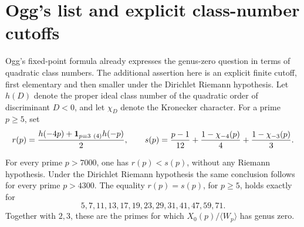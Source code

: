\section{Ogg's list and explicit class-number cutoffs}
Ogg's fixed-point formula already expresses the genus-zero question
in terms of quadratic class numbers. The additional assertion here is
an explicit finite cutoff, first elementary and then smaller under
the Dirichlet Riemann hypothesis.
Let \(h(D)\) denote the proper ideal class number of the quadratic
order of discriminant \(D<0\), and let \(\chi_D\) denote the
Kronecker character. For a prime \(p\ge5\), set
\[
 r(p)=\frac{h(-4p)+{\bf1}_{p\equiv3\ (4)}h(-p)}2,\qquad
 s(p)=\frac{p-1}{12}+\frac{1-\chi_{-4}(p)}4+
                         \frac{1-\chi_{-3}(p)}3.
\]

\begin{theorem}\label{thm:ogg-cutoffs}
For every prime \(p>7000\), one has \(r(p)<s(p)\), without any
Riemann hypothesis. Under the Dirichlet Riemann hypothesis the same
conclusion follows for every prime \(p>4300\).
The equality \(r(p)=s(p)\), for \(p\ge5\), holds exactly for
\[
 5,7,11,13,17,19,23,29,31,41,47,59,71.
\]
Together with \(2,3\), these are the primes for which
\(X_0(p)/\langle W_p\rangle\) has genus zero.
\end{theorem}

